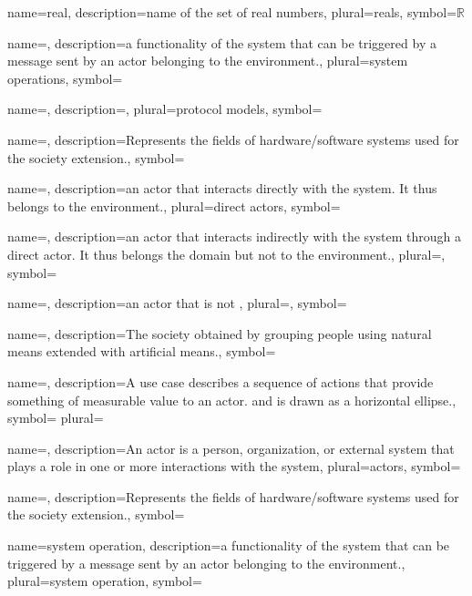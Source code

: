 {name={real},
description={name of the set of real numbers},
plural={reals},
symbol={\ensuremath{\mathbb{R}}}
}

{name={},
description={a functionality of the system that can be triggered by a message sent by an actor belonging to the environment.},
plural={system operations},
symbol={}
}

{name={},
description={},
plural={protocol models},
symbol={}
}

{name={},
description={Represents the fields of hardware/software
systems used for the society extension.},
symbol={}
}

{name={},
description={an actor that interacts directly with the system. It thus belongs to the environment.},
plural={direct actors},
symbol={}
}

{name={},
description={an actor that interacts indirectly with the system through a direct actor. It thus belongs the domain but not to the environment.},
plural={},
symbol={}
}

{name={},
description={an actor that is not },
plural={},
symbol={}
}

{name={},
description={The society obtained by grouping people using natural means
extended with artificial means.},
symbol={} }

{name={},
description={A use case describes a sequence of actions that provide something
of measurable value to an actor. and is drawn as a horizontal ellipse.},
symbol={} 
plural={} }

{name={},
description={An actor is a person, organization, or external system that plays a role in one or more interactions with the system},
plural={actors},
symbol={}
}

{name={},
description={Represents the fields of hardware/software
systems used for the society extension.},
symbol={}
}

{name={system operation},
description={a functionality of the system that can be triggered by a message sent by an actor belonging to the environment.},
plural={system operation},
symbol={}
}




